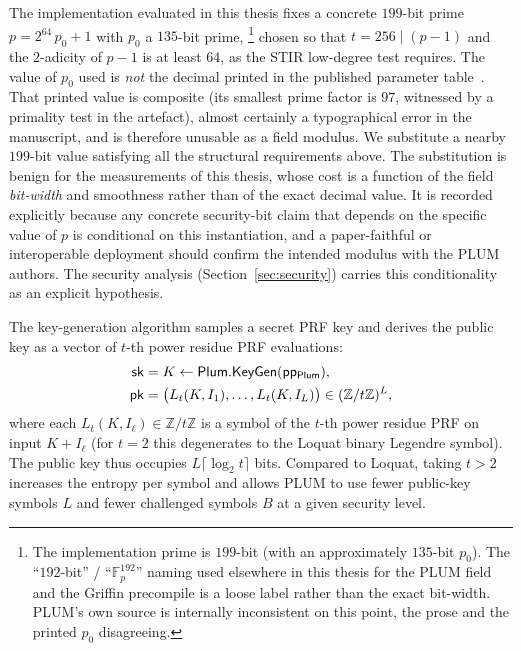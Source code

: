 \begin{remark}\label{rem:prime-substitution}
The implementation evaluated in this thesis fixes a concrete $199$-bit prime $p = 2^{64}\,p_0 + 1$ with $p_0$ a $135$-bit prime,
\footnote{The implementation prime is $199$-bit (with an approximately $135$-bit $p_0$). The ``$192$-bit'' / ``$\mathbb{F}_p^{192}$'' naming used elsewhere in this thesis for the PLUM field and the Griffin precompile is a loose label rather than the exact bit-width. PLUM's own source is internally inconsistent on this point, the prose and the printed $p_0$ disagreeing.} chosen so that $t = 256 \mid (p-1)$ and the $2$-adicity of $p-1$ is at least $64$, as the STIR low-degree test requires. The value of $p_0$ used is \emph{not} the decimal printed in the published parameter table~\cite[\S3.3]{10.1007/978-981-95-2961-2_6}. That printed value is composite (its smallest prime factor is $97$, witnessed by a primality test in the artefact), almost certainly a typographical error in the manuscript, and is therefore unusable as a field modulus. We substitute a nearby $199$-bit value satisfying all the structural requirements above. The substitution is benign for the measurements of this thesis, whose cost is a function of the field \emph{bit-width} and smoothness rather than of the exact decimal value. It is recorded explicitly because any concrete security-bit claim that depends on the specific value of $p$ is conditional on this instantiation, and a paper-faithful or interoperable deployment should confirm the intended modulus with the PLUM authors. The security analysis (Section~\ref{sec:security}) carries this conditionality as an explicit hypothesis.
\end{remark}

The key-generation algorithm samples a secret PRF key and derives the public key as a vector of \(t\)-th power residue PRF evaluations:
\begin{equation*}
  \begin{aligned}
    \mathsf{sk} &= K \leftarrow \mathsf{Plum}.\mathsf{KeyGen}(\mathsf{pp_{Plum}}),
    \\
    \mathsf{pk} &= \bigl(L_t(K,I_1),\ldots,L_t(K,I_L)\bigr) \in (\mathbb{Z}/t\mathbb{Z})^L,
  \end{aligned}
\end{equation*}
where each \(L_t(K,I_\ell)\in\mathbb{Z}/t\mathbb{Z}\) is a symbol of the \(t\)-th power residue PRF on input \(K + I_\ell\) (for \(t=2\) this degenerates to the Loquat binary Legendre symbol). The public key thus occupies \(L\lceil\log_2 t\rceil\) bits. Compared to Loquat, taking \(t>2\) increases the entropy per symbol and allows PLUM to use fewer public-key symbols \(L\) and fewer challenged symbols \(B\) at a given security level.

